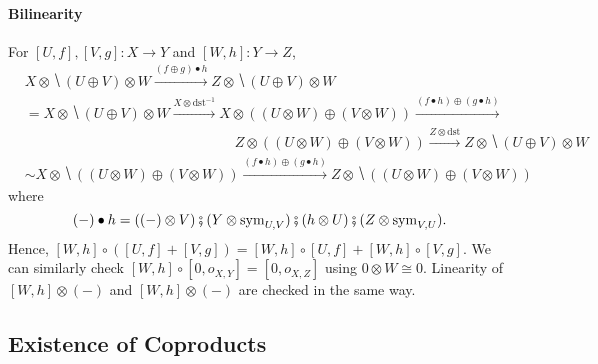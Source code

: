 \paragraph{Bilinearity}

For $[U,f],[V,g] \colon X \to Y$ and $[W,h] \colon Y \to Z$,
\begin{align*}
  & X \otimes \hide{(U \oplus V) \otimes W} \xrightarrow{(f \oplus g) \bullet h}
    Z \otimes \hide{(U \oplus V) \otimes W} \\
  &= X \otimes \hide{(U \oplus V) \otimes W} \xrightarrow{X \otimes \mathrm{dst}^{-1}}
    X \otimes ((U \otimes W) \oplus (V \otimes W)) \xrightarrow{(f \bullet h) \oplus (g \bullet h)}
     \\
  &\hspace{15em}
    Z \otimes ((U \otimes W) \oplus (V \otimes W))
    \xrightarrow{Z \otimes \mathrm{dst}}
    Z \otimes \hide{(U \oplus V) \otimes W} \\
  &\sim
    X \otimes \hide{((U \otimes W) \oplus (V \otimes W))}
    \xrightarrow{(f \bullet h) \oplus (g \bullet h)}
    Z \otimes \hide{((U \otimes W) \oplus (V \otimes W))}
\end{align*}
where
\begin{equation*}
  (-) \bullet h =
  ((-) \otimes V) \fatsemi (Y \otimes \mathrm{sym}_{U,V})
  \fatsemi (h \otimes U) \fatsemi (Z \otimes \mathrm{sym}_{V,U}).
\end{equation*}
Hence, $[W,h] \circ ([U,f] + [V,g]) = [W,h] \circ [U,f] + [W,h] \circ
[V,g]$. We can similarly check $[W,h] \circ [0,o_{X,Y}] = [0,o_{X,Z}]$
using $0 \otimes W \cong 0$. Linearity of $[W,h] \otimes (-)$
and $[W,h] \otimes (-)$ are checked in the same way.

\subsection{Existence of Coproducts}

